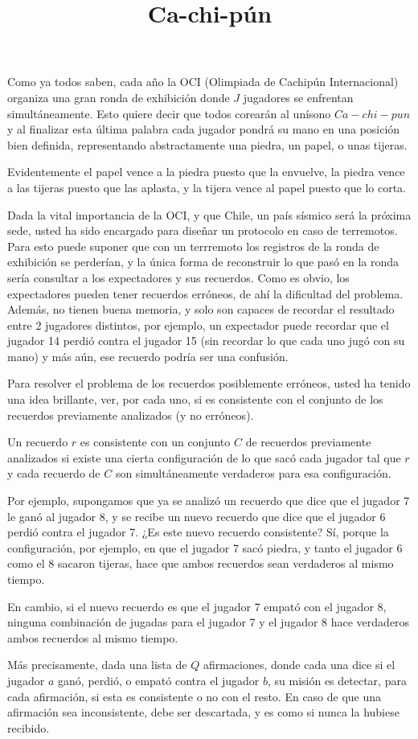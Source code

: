 \documentclass{oci}
\title{Ca-chi-pún}
\begin{document}
\begin{problemDescription}
  Como ya todos saben, cada año la OCI (Olimpiada de Cachipún Internacional) organiza una gran ronda de exhibición donde $J$ jugadores se enfrentan simultáneamente. Esto quiere decir que todos corearán al unísono $Ca - chi - pun$ y al finalizar esta última palabra cada jugador pondrá su mano en una posición bien definida, representando abstractamente una piedra, un papel, o unas tijeras. 

Evidentemente el papel vence a la piedra puesto que la envuelve, la piedra vence a las tijeras puesto que las aplasta, y la tijera vence al papel puesto que lo corta.

Dada la vital importancia de la OCI, y que Chile, un país sísmico será la próxima sede, usted ha sido encargado para diseñar un protocolo en caso de terremotos.
Para esto puede suponer que con un terrremoto los registros de la ronda de exhibición se perderían, y la única forma de reconstruir lo que pasó en la ronda sería consultar a los expectadores y sus recuerdos. Como es obvio, los expectadores pueden tener recuerdos erróneos, de ahí la dificultad del problema. Además, no tienen buena memoria, y solo son capaces de recordar el resultado entre 2 jugadores distintos, por ejemplo, un expectador puede recordar que el jugador 14 perdió contra el jugador 15 (sin recordar lo que cada uno jugó con su mano) y más aún, ese recuerdo podría ser una confusión.

Para resolver el problema de los recuerdos posiblemente erróneos, usted ha tenido una idea brillante, ver, por cada uno, si es consistente con el conjunto de los recuerdos previamente analizados (y no erróneos).

Un recuerdo $r$ es consistente con un conjunto $C$ de recuerdos previamente analizados si existe una cierta configuración de lo que sacó cada jugador tal que $r$ y cada recuerdo de $C$ son simultáneamente verdaderos para esa configuración. 

Por ejemplo, supongamos que ya se analizó un recuerdo que dice que el jugador 7 le ganó al jugador 8, y se recibe un nuevo recuerdo que dice que el jugador 6 perdió contra el jugador 7. ¿Es este nuevo recuerdo consistente? Sí, porque la configuración, por ejemplo, en que el jugador 7 sacó piedra, y tanto el jugador 6 como el 8 sacaron tijeras, hace que ambos recuerdos sean verdaderos al mismo tiempo. 

En cambio, si el nuevo recuerdo es que el jugador 7 empató con el jugador 8, ninguna combinación de jugadas para el jugador 7 y el jugador 8 hace verdaderos ambos recuerdos al mismo tiempo.

Más precisamente, dada una lista de $Q$ afirmaciones, donde cada una dice si el jugador $a$ ganó, perdió, o empató contra el jugador $b$, su misión es detectar, para cada afirmación, si esta es consistente o no con el resto. En caso de que una afirmación sea inconsistente, debe ser descartada, y es como si nunca la hubiese recibido.

\end{problemDescription}
\end{document}
